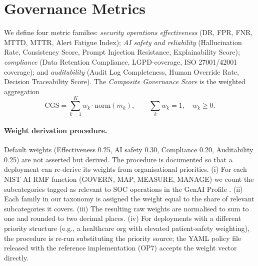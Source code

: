 \documentclass[preprint,12pt,authoryear]{elsarticle}
\begin{document}
\section{Governance Metrics}
\label{sec:metrics}

We define four metric families: \emph{security operations effectiveness} (DR, FPR, FNR, MTTD, MTTR, Alert Fatigue Index); \emph{AI safety and reliability} (Hallucination Rate, Consistency Score, Prompt Injection Resistance, Explainability Score); \emph{compliance} (Data Retention Compliance, LGPD-coverage, ISO 27001/42001 coverage); and \emph{auditability} (Audit Log Completeness, Human Override Rate, Decision Traceability Score). The \emph{Composite Governance Score} is the weighted aggregation
\begin{equation}
\text{CGS} = \sum_{k=1}^{K} w_k \cdot \text{norm}(m_k), \qquad \sum_k w_k = 1, \quad w_k \geq 0.
\end{equation}

\paragraph{Weight derivation procedure.}
Default weights (Effectiveness 0.25, AI safety 0.30, Compliance 0.20, Auditability 0.25) are not asserted but derived. The procedure is documented so that a deployment can re-derive its weights from organisational priorities. (i) For each NIST AI RMF function (GOVERN, MAP, MEASURE, MANAGE) we count the subcategories tagged as relevant to SOC operations in the GenAI Profile \citep{nist2024genai}. (ii) Each family in our taxonomy is assigned the weight equal to the share of relevant subcategories it covers. (iii) The resulting raw weights are normalised to sum to one and rounded to two decimal places. (iv) For deployments with a different priority structure (e.g., a healthcare org with elevated patient-safety weighting), the procedure is re-run substituting the priority source; the YAML policy file released with the reference implementation (OP7) accepts the weight vector directly.
\end{document}
